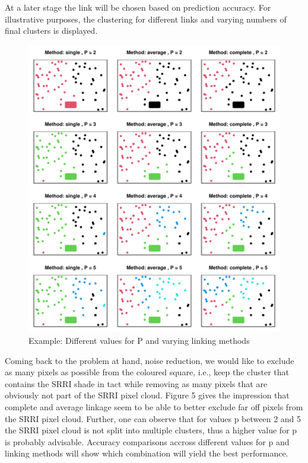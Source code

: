 \documentclass[aodsor,preprint]{imsart}
\numberwithin{equation}{section}
\theoremstyle{plain}
\begin{document}
At a later stage the link will be chosen based on prediction accuracy. For illustrative purposes, the clustering for different links and varying numbers of final clusters is displayed.\newpage

\begin{figure}[H]
	\includegraphics[width = 12cm]{methodsclust.pdf}
	\caption{Example: Different values for P and varying linking methods}
	\label{fig5}
\end{figure}

Coming back to the problem at hand, noise reduction, we would like to exclude as many pixels as possible from the coloured square, i.e., keep the cluster that contains the SRRI shade in tact while removing as many pixels that are obviously not part of the SRRI pixel cloud. Figure 5 gives the impression that complete and average linkage seem to be able to better exclude far off pixels from the SRRI pixel cloud. Further, one can observe that for values p between 2 and 5 the SRRI pixel cloud is not split into multiple clusters, thus a higher value for p is probably advisable. Accuracy comparisons accross different values for p and linking methods will show which combination will yield the best performance.\newpage
\end{document}
